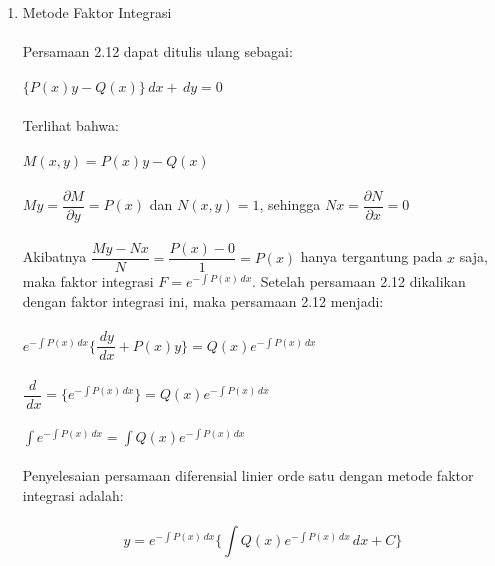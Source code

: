 \begin{enumerate}[1.]
	\item Metode Faktor Integrasi \\ \\
	Persamaan 2.12 dapat ditulis ulang sebagai: \\ \\
	\begin{math} \bigg\{ P(x)y - Q(x) \bigg\} \, dx + \, dy = 0 \end{math} \\ \\
	Terlihat bahwa: \\ \\
	\begin{math} M(x, y) = P(x)y - Q(x) \end{math} \\ \\
	\begin{math} My = \dfrac{\partial M}{\partial y} = P(x) \end{math} dan \begin{math} N(x, y) = 1 \end{math}, sehingga \begin{math} Nx = \dfrac{\partial N}{\partial x} = 0 \end{math} \\ \\
	Akibatnya \begin{math} \dfrac{My - Nx}{N} = \dfrac{P(x) - 0}{1} = P(x) \end{math} hanya tergantung pada \begin{math} x \end{math} saja, maka faktor integrasi \begin{math} F = e^{- \int P(x) \, dx} \end{math}. Setelah persamaan 2.12 dikalikan dengan faktor 	integrasi ini, maka persamaan 2.12 menjadi: \\ \\
	\begin{math}  e^{- \int P(x) \, dx} \bigg\{ \dfrac{\, dy}{\, dx} + P(x)y \bigg\} = Q(x)e^{- \int P(x) \, dx} \end{math} \\ \\
	\begin{math} \dfrac{d}{\, dx} = \bigg\{ e^{- \int P(x) \, dx} \bigg\} = Q(x)e^{- \int P(x) \, dx} \end{math} \\ \\
	\begin{math} \int e^{- \int P(x) \, dx} = \int Q(x)e^{- \int P(x) \, dx}\end{math} \\ \\
	Penyelesaian persamaan diferensial linier orde satu dengan metode faktor integrasi adalah: \\ \\
	\begin{equation} y =  e^{- \int P(x) \, dx} \bigg\{ \int Q(x)e^{- \int P(x) \, dx} \, dx + C \bigg\} \end{equation}

\end{enumerate}

